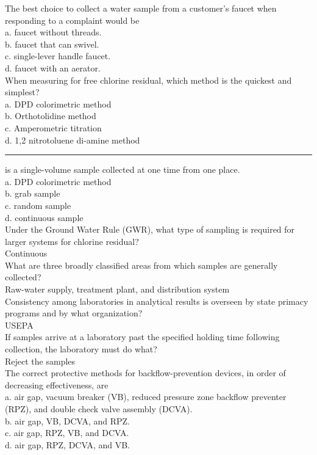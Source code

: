 The best choice to collect a water sample from a customer's faucet when responding to a complaint would be\\
a.	faucet without threads.\\
b.	faucet that can swivel.\\
c.	single-lever handle faucet.\\
d.	faucet with an aerator.\\
When measuring for free chlorine residual, which method is the quickest and simplest?\\
a.	DPD colorimetric method\\
b.	Orthotolidine method\\
c.	Amperometric titration\\
d.	1,2 nitrotoluene di-amine method\\
\rule{1.2cm}{0.1pt}is a single-volume sample collected at one time from one place.\\
a.	DPD colorimetric method\\
b.	grab sample\\
c.	random sample\\
d.	continuous sample\\
Under the Ground Water Rule (GWR), what type of sampling is required for larger systems for chlorine residual?\\
Continuous\\
What are three broadly classified areas from which samples are generally collected?\\
Raw-water supply, treatment plant, and distribution system\\
Consistency among laboratories in analytical results is overseen by state primacy programs and by what organization?\\
USEPA\\
If samples arrive at a laboratory past the specified holding time following collection, the laboratory must do what?\\
Reject the samples\\
The correct protective methods for backflow-prevention devices, in order of decreasing effectiveness, are\\
a.	air gap, vacuum breaker (VB), reduced pressure zone backflow preventer (RPZ), and double check valve assembly (DCVA).\\
b.	air gap, VB, DCVA, and RPZ.\\
c.	air gap, RPZ, VB, and DCVA.\\
d.	air gap, RPZ, DCVA, and VB.\\

